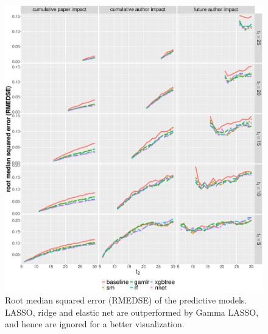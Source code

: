 \begin{refsection}
\begin{figure}[ht!]
    \centering
    \includegraphics[width=\textwidth]{figures/pred_model/medse_diff.eps}
    \caption{Root median squared error (RMEDSE) of the predictive models. LASSO, ridge and elastic net are outperformed by Gamma LASSO, and hence are ignored for a better visualization.}
    \label{fig:pred_medse}
\end{figure}


\end{refsection}
